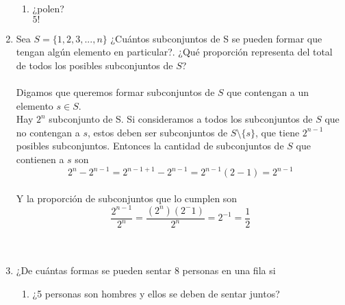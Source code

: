 \documentclass[12pt,a4paper]{report}
\begin{document}
\begin{enumerate}
{\begin{enumerate}[label=\alph*) ]
{	"Esternocleidomastoideo" posee 22 letras. Si tomamos $22!$ tendríamos las combinaciones posibles, 		no obstante esto repitiría los casos con las letras que están más de una vez en la palabra. 			    Entonces quedaría de la siguiente manera: $\frac{22!}{4!2!2!4!2!2!}$

   }

   \item {
   ¿polen?\\

	$5!$
   }
	\end{enumerate}

	}

   \item {
    Sea $S = \{1, 2, 3, ... , n\}$ ¿Cuántos subconjuntos de S se pueden
    formar que tengan algún elemento en particular?. ¿Qué proporción
    representa del total de todos los posibles subconjuntos de $S$?\\\\

		Digamos que queremos formar subconjuntos de $S$ que contengan a un elemento
		$s \in S$.\\
		Hay $2^n$ subconjunto de S. Si consideramos a todos los subconjuntos de $S$ que no
		contengan a $s$, estos deben ser subconjuntos de $S \setminus \{s\}$, que tiene $2^{n-1}$
		posibles subconjuntos. Entonces la cantidad de subconjuntos de $S$ que
		contienen a $s$ son\\
		\begin{equation*}
			2^n - 2^{n-1} = 2^{n - 1 + 1} - 2^{n-1} = 2^{n-1}(2 - 1) = 2^{n-1}
		\end{equation*}\\
		Y la proporción de subconjuntos que lo cumplen son\\
		\begin{equation*}
			\frac{2^{n-1}}{2^n}	= \frac{(2^n) (2^-1)}{2^n} = 2^{-1} = \frac{1}{2}
		\end{equation*}
		\\\\
	}

   \item {
    ¿De cuántas formas se pueden sentar 8 personas en una fila si\\

	\begin{enumerate}[label=\alph*) ]
   \item {
   ¿5 personas son hombres y ellos se deben de sentar juntos?\\

}
\end{enumerate}}
\end{enumerate}
\end{document}
